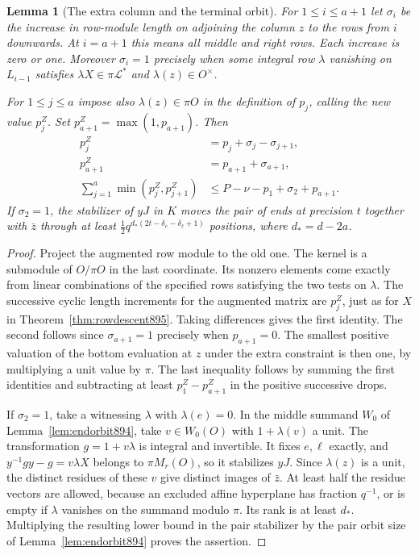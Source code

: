 \documentclass[a4paper,11pt]{article}
\newtheorem{lemma}[proposition]{Lemma}
\theoremstyle{definition}
\theoremstyle{remark}
\numberwithin{equation}{section}
\begin{document}
\begin{lemma}[The extra column and the terminal orbit]
\leavevmode\label{lem:augmentedrows896}
For \(1\le i\le a+1\) let \(\sigma_i\) be the increase in row-module
length on adjoining the column \(z\) to the rows from \(i\)
downwards. At \(i=a+1\) this means all middle and right rows.
Each increase is zero or one. Moreover \(\sigma_i=1\) precisely
when some integral row \(\lambda\) vanishing on \(L_{i-1}\)
satisfies \(\lambda X\in\pi\mathcal L^*\) and
\(\lambda(z)\in O^\times\).

For \(1\le j\le a\) impose also \(\lambda(z)\in\pi O\) in
the definition of \(p_j\), calling the new value \(p_j^Z\).
Set \(p_{a+1}^Z=\max(1,p_{a+1})\). Then
\begin{align*}
 p_j^Z &=p_j+\sigma_j-\sigma_{j+1},\\
 p_{a+1}^Z &=p_{a+1}+\sigma_{a+1},\\
 \sum_{j=1}^a\min(p_j^Z,p_{j+1}^Z)
   &\le P-\nu-p_1+\sigma_2+p_{a+1}.
\end{align*}
If \(\sigma_2=1\), the stabilizer of \(yJ\) in \(K\) moves the
pair of ends at precision \(t\) together with \(\bar z\) through
at least \(\tfrac12 q^{d_*(2t-\delta_e-\delta_\ell+1)}\) positions,
where \(d_*=d-2a\).
\end{lemma}
\begin{proof}
Project the augmented row module to the old one. The kernel
is a submodule of \(O/\pi O\) in the last coordinate. Its
nonzero elements come exactly from linear combinations of the
specified rows satisfying the two tests on \(\lambda\).
The successive cyclic length increments for the augmented matrix
are \(p_j^Z\), just as for \(X\) in Theorem~\ref{thm:rowdescent895}.
Taking differences gives the first identity. The second follows
since \(\sigma_{a+1}=1\) precisely when \(p_{a+1}=0\). The
smallest positive valuation of the bottom evaluation at \(z\)
under the extra constraint is then one, by multiplying a unit
value by \(\pi\). The last inequality follows by summing the
first identities and subtracting at least \(p_1^Z-p_{a+1}^Z\)
in the positive successive drops.

If \(\sigma_2=1\), take a witnessing \(\lambda\) with
\(\lambda(e)=0\). In the middle summand \(W_0\) of
Lemma~\ref{lem:endorbit894}, take \(v\in W_0(O)\) with
\(1+\lambda(v)\) a unit. The transformation \(g=1+v\lambda\)
is integral and invertible. It fixes \(e,\ell\) exactly, and
\(y^{-1}gy-g=v\lambda X\) belongs to \(\pi M_r(O)\), so it
stabilizes \(yJ\). Since \(\lambda(z)\) is a unit, the distinct
residues of these \(v\) give distinct images of \(\bar z\).
At least half the residue vectors are allowed, because an
excluded affine hyperplane has fraction \(q^{-1}\), or is empty
if \(\lambda\) vanishes on the summand modulo \(\pi\).
Its rank is at least \(d_*\). Multiplying the resulting lower
bound in the pair stabilizer by the pair orbit size of
Lemma~\ref{lem:endorbit894} proves the assertion.
\end{proof}
\end{document}
